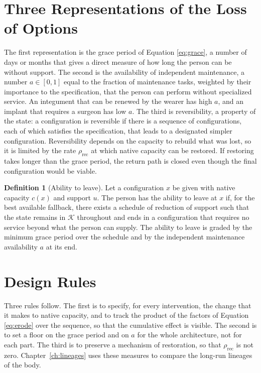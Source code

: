 \documentclass[11pt,openany]{book}
\theoremstyle{definition}
\newtheorem{definition}{Definition}[chapter]
\theoremstyle{remark}
\newcommand{\Kset}{\mathcal{K}}
\begin{document}
\section{Three Representations of the Loss of Options}

The first representation is the grace period of Equation \eqref{eq:grace}, a number of days or months that gives a direct measure of how long the person can be without support. The second is the availability of independent maintenance, a number $a\in[0,1]$ equal to the fraction of maintenance tasks, weighted by their importance to the specification, that the person can perform without specialized service. An integument that can be renewed by the wearer has high $a$, and an implant that requires a surgeon has low $a$. The third is reversibility, a property of the state: a configuration is reversible if there is a sequence of configurations, each of which satisfies the specification, that leads to a designated simpler configuration. Reversibility depends on the capacity to rebuild what was lost, so it is limited by the rate $\rho_{\mathrm{rec}}$ at which native capacity can be restored. If restoring takes longer than the grace period, the return path is closed even though the final configuration would be viable.

\begin{definition}[Ability to leave]
Let a configuration $x$ be given with native capacity $c(x)$ and support $u$. The person has the ability to leave at $x$ if, for the best available fallback, there exists a schedule of reduction of support such that the state remains in $\Kset$ throughout and ends in a configuration that requires no service beyond what the person can supply. The ability to leave is graded by the minimum grace period over the schedule and by the independent maintenance availability $a$ at its end.
\end{definition}

\section{Design Rules}

Three rules follow. The first is to specify, for every intervention, the change that it makes to native capacity, and to track the product of the factors of Equation \eqref{eq:erode} over the sequence, so that the cumulative effect is visible. The second is to set a floor on the grace period and on $a$ for the whole architecture, not for each part. The third is to preserve a mechanism of restoration, so that $\rho_{\mathrm{rec}}$ is not zero. Chapter~\ref{ch:lineages} uses these measures to compare the long-run lineages of the body.
\end{document}

